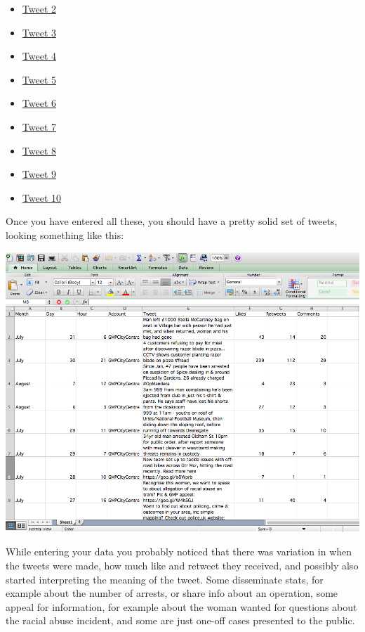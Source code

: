 \documentclass[]{book}
\providecommand{\tightlist}{%
  \setlength{\itemsep}{0pt}\setlength{\parskip}{0pt}}
\theoremstyle{definition}
\theoremstyle{definition}
\theoremstyle{definition}
\theoremstyle{remark}
\begin{document}
\begin{itemize}
\tightlist
\item
  \href{https://twitter.com/GMPCityCentre/status/891762454337867776}{Tweet
  2}
\item
  \href{https://twitter.com/GMPCityCentre/status/894515606321590273}{Tweet
  3}
\item
  \href{https://twitter.com/GMPCityCentre/status/894024570109386752}{Tweet
  4}
\item
  \href{https://twitter.com/GMPCityCentre/status/891247668772708352}{Tweet
  5}
\item
  \href{https://twitter.com/GMPCityCentre/status/891254643078176768}{Tweet
  6}
\item
  \href{https://twitter.com/GMPCityCentre/status/890871354924421120}{Tweet
  7}
\item
  \href{https://twitter.com/GMPCityCentre/status/890594946536927233}{Tweet
  8}
\item
  \href{https://twitter.com/GMPCityCentre/status/890161961626996736}{Tweet
  9}
\item
  \href{https://twitter.com/GMPCityCentre/status/889084990495051776}{Tweet
  10}
\end{itemize}

Once you have entered all these, you should have a pretty solid set of
tweets, looking something like this:

\includegraphics{imgs/gmp_tweets.png}

While entering your data you probably noticed that there was variation
in when the tweets were made, how much like and retweet they received,
and possibly also started interpreting the meaning of the tweet. Some
disseminate stats, for example about the number of arrests, or share
info about an operation, some appeal for information, for example about
the woman wanted for questions about the racial abuse incident, and some
are just one-off cases presented to the public.
\end{document}
